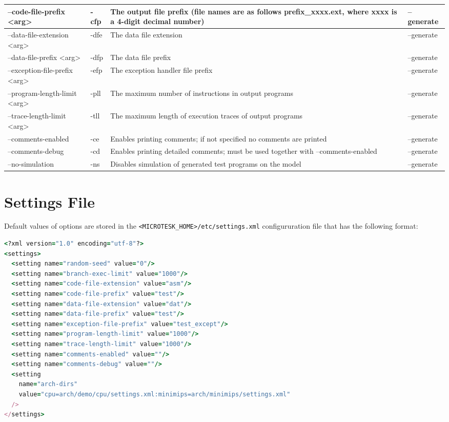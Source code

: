 \documentclass[oneside,final,12pt]{extreport}
\begin{document}
\begin{tabular}{ | p{4cm} | p{1cm} | p{5cm} | p{2.5cm} |}
  \hline
  --code-file-prefix <arg> & -cfp & The output file prefix (file names are as follows prefix{\_}xxxx.ext, where xxxx is a 4-digit decimal number) & --generate \\ \hline
  --data-file-extension <arg> & -dfe & The data file extension & --generate \\ \hline
  --data-file-prefix <arg> & -dfp & The data file prefix & --generate \\ \hline
  --exception-file-prefix <arg> & -efp & The exception handler file prefix & --generate \\ \hline
  --program-length-limit <arg> & -pll & The maximum number of instructions in output programs & --generate \\ \hline
  --trace-length-limit <arg> & -tll & The maximum length of execution traces of output programs & --generate \\ \hline
  --comments-enabled & -ce & Enables printing comments; if not specified no comments are printed & --generate \\ \hline
  --comments-debug & -cd & Enables printing detailed comments; must be used together with --comments-enabled  & --generate \\ \hline
  --no-simulation & -ns & Disables simulation of generated test programs on the model & --generate \\ \hline
\end{tabular}

\section{Settings File}

Default values of options are stored in the \texttt{<MICROTESK{\_}HOME>/etc/settings.xml}
configururation file that has the following format:

\begin{lstlisting}[language=ruby]
<?xml version="1.0" encoding="utf-8"?>
<settings>
  <setting name="random-seed" value="0"/>
  <setting name="branch-exec-limit" value="1000"/>
  <setting name="code-file-extension" value="asm"/>
  <setting name="code-file-prefix" value="test"/>
  <setting name="data-file-extension" value="dat"/>
  <setting name="data-file-prefix" value="test"/>
  <setting name="exception-file-prefix" value="test_except"/>
  <setting name="program-length-limit" value="1000"/>
  <setting name="trace-length-limit" value="1000"/>
  <setting name="comments-enabled" value=""/>
  <setting name="comments-debug" value=""/>
  <setting
    name="arch-dirs" 
    value="cpu=arch/demo/cpu/settings.xml:minimips=arch/minimips/settings.xml"
  />
</settings>
\end{lstlisting}
\end{document}
